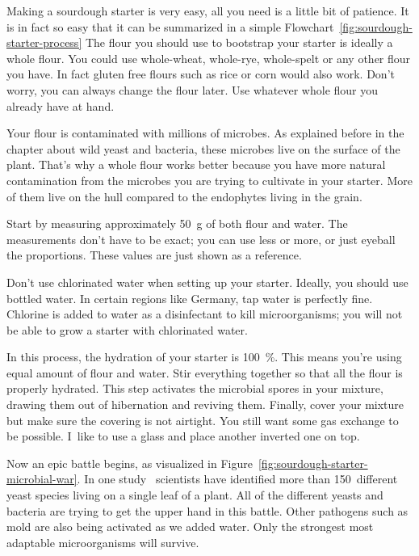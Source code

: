 Making a sourdough starter is very easy, all you need
is a little bit of patience. It is in fact so easy that it can be summarized
in a simple Flowchart~\ref{fig:sourdough-starter-process} The flour you should
use to bootstrap your starter is ideally a whole flour.
You could use whole-wheat, whole-rye, whole-spelt or
any other flour you have. In fact gluten free flours such
as rice or corn would also work. Don't worry, you can always
change the flour later. Use whatever whole flour you
already have at hand.

\begin{flowchart}[!htb]
\centering
  
  \caption[The full sourdough starter process]{The process of making a sourdough
      starter from scratch.}%
  \label{fig:sourdough-starter-process}
\end{flowchart}

Your flour is contaminated with millions of microbes. As explained
before in the chapter about wild yeast and bacteria, these
microbes live on the surface of the plant. That's why
a whole flour works better because you have more natural
contamination from the microbes you are trying to cultivate
in your starter. More of them live on the hull compared to the
endophytes living in the grain.

Start by measuring approximately \qty{50}{\gram} of both flour and
water. The measurements don't have to be exact; you can use
less or more, or just eyeball the proportions. These
values are just shown as a reference.

Don't use chlorinated water when setting up your starter.
Ideally, you should use bottled water. In certain regions
like Germany, tap water is perfectly fine. Chlorine is added
to water as a disinfectant to kill microorganisms; you will
not be able to grow a starter with chlorinated water.

In this process, the hydration of your starter is \qty{100}{\percent}.
This means you're using equal amount of flour and
water. Stir everything together so that all the flour is
properly hydrated. This step activates the microbial spores
in your mixture, drawing them out of hibernation and
reviving them.
Finally, cover your mixture but make sure the covering is
not airtight. You still want some gas exchange to be possible.
I~like to use a glass and place another
inverted one on top.

Now an epic battle begins, as visualized in
Figure~\ref{fig:sourdough-starter-microbial-war}. In one
study~\cite{yeasts+biocontrol+agent} scientists have identified
more than \num{150}~different yeast species living
on a single leaf of a plant.
All of the different yeasts and bacteria are trying to get
the upper hand in this battle. Other pathogens such as mold
are also being activated as we added water. Only the strongest
most adaptable microorganisms will survive.

